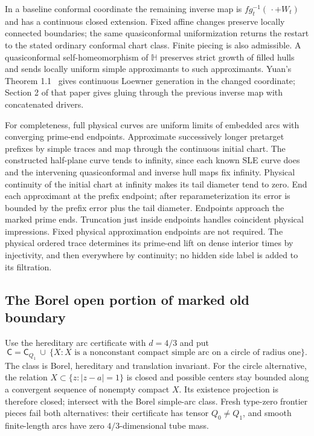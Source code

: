 In a baseline conformal coordinate the remaining inverse map is
$f g_t^{-1}(\,\cdot+W_t)$ and has a continuous closed extension.
Fixed affine changes preserve locally connected boundaries; the same
quasiconformal uniformization returns the restart to the stated
ordinary conformal chart class. Finite piecing is also admissible.
A quasiconformal self-homeomorphism of $\mathbb H$ preserves strict
growth of filled hulls and sends locally uniform simple approximants
to such approximants. Yuan's Theorem 1.1~\cite{yuan} gives continuous
Loewner generation in the changed coordinate; Section 2 of that
paper gives gluing through the previous inverse map with concatenated
drivers.

For completeness, full physical curves are uniform limits of embedded
arcs with converging prime-end endpoints. Approximate successively
longer pretarget prefixes by simple traces and map through the
continuous initial chart. The constructed half-plane curve tends
to infinity, since each known SLE curve does and the intervening
quasiconformal and inverse hull maps fix infinity. Physical continuity
of the initial chart at infinity makes its tail diameter tend to
zero. End each approximant at the prefix endpoint; after
reparameterization its error is bounded by the prefix error plus
the tail diameter. Endpoints approach the marked prime ends.
Truncation just inside endpoints handles coincident physical
impressions. Fixed physical approximation endpoints are not required.
The physical ordered trace determines its prime-end lift on dense
interior times by injectivity, and then everywhere by continuity;
no hidden side label is added to its filtration.

\subsection{The Borel open portion of marked old boundary}

Use the hereditary arc certificate with $d=4/3$ and put
\[
 \mathsf C=\mathsf C_{Q_1}\ \cup\
 \{X:X\text{ is a nonconstant compact simple arc on a circle
 of radius one}\}.
 \tag{OS4}
\]
The class is Borel, hereditary and translation invariant.
For the circle alternative, the relation
$X\subset\{z:|z-a|=1\}$ is closed and possible centers stay bounded
along a convergent sequence of nonempty compact $X$.
Its existence projection is therefore closed; intersect with the
Borel simple-arc class. Fresh type-zero frontier pieces fail both
alternatives: their certificate has tensor $Q_0\ne Q_1$, and smooth
finite-length arcs have zero $4/3$-dimensional tube mass.

